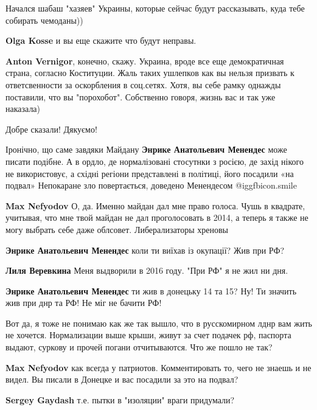 \begin{itemize}
Начался шабаш "хазяев" Украины, которые сейчас будут рассказывать, куда тебе собирать чемоданы))

\begin{itemize} %
\textbf{Olga Kosse} и вы еще скажите что будут неправы.

\textbf{Anton Vernigor}, конечно, скажу. Украина, вроде все еще демократичная страна, согласно Коституции. Жаль таких ушлепков как вы нельзя призвать к ответсвенности за оскорбления в соц.сетях. Хотя, вы себе рамку однажды поставили, что вы "порохобот". Собственно говоря, жизнь вас и так уже наказала)
\end{itemize} %

Добре сказали! Дякуємо!


Іронічно, що саме завдяки Майдану \textbf{Энрике Анатольевич Менендес} може
писати подібне. А в ордло, де нормалізовані стосутнки з росією, де захід нікого
не використовує, а східні регіони представлені в політиці, його посадили «на
подвал» Непокаране зло повертається, доведено Менендесом  @igg{fbicon.smile} 

\begin{itemize} %
\textbf{Max Nefyodov} О, да. Именно майдан дал мне право голоса.
Чушь в квадрате, учитывая, что мне твой майдан не дал проголосовать в 2014, а теперь я также не могу выбрать себе даже облсовет.
Либерализаторы хреновы

\textbf{Энрике Анатольевич Менендес} коли ти виїхав із окупації? Жив при РФ?

\textbf{Лиля Веревкина} Меня выдворили в 2016 году. "При РФ" я не жил ни дня.

\textbf{Энрике Анатольевич Менендес} ти жив в донецьку 14 та 15? Ну! Ти значить жив при днр та РФ! Не міг не бачити РФ!


Вот да, я тоже не понимаю как же так вышло, что в русскомирном лднр вам жить не
хочется. Нормализации выше крыши, живут за счет подачек рф, паспорта выдают,
суркову и прочей погани отчитываются. Что же пошло не так?

\textbf{Max Nefyodov} как всегда у патриотов. Комментировать то, чего не знаешь и не видел. Вы писали в Донецке и вас посадили за это на подвал?

\textbf{Sergey Gaydash} т.е. пытки в "изоляции" враги придумали?


\end{itemize}
\end{itemize}
